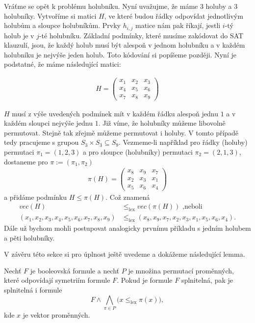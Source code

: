 \begin{prikl}
Vráťme se opět k problému holubníku. Nyní uvažujme, že máme 3 holuby a 3 holubníky. Vytvoříme si matici $H$, ve které budou řádky odpovídat jednotlivým holubům a sloupce holubníkům. Prvky $h_{i,j}$ matice nám pak říkají, jestli $i$-tý holub je v $j$-té holubníku. Základní podmínky, které musíme zakódovat do SAT klauzulí, jsou, že každý holub musí být alespoň v jednom holubníku a v každém holubníku je nejvýše jeden holub. Toto kódování si popíšeme později. Nyní je podstatné, že máme následující matici:

\begin{align*}
H =  \begin{pmatrix}
x_1 & x_2 & x_3 \\
x_4 & x_5 & x_6 \\
x_7 & x_8 & x_9 
\end{pmatrix}
\end{align*}

$H$ musí z výše uvedených podmínek mít v každém řádku alespoň jednu $1$ a v každém sloupci nejvýše jednu $1$. Již víme, že holubníky můžeme libovolně permutovat. Stejně tak zřejmě můžeme permutovat i holuby. V tomto případě tedy pracujeme s grupou $S_3 \times S_3 \subseteq S_9$. Vezmeme-li například pro řádky (holuby) permutaci $\pi_1 = (1,2,3)$ a pro sloupce (holubníky) permutaci $\pi_2 = (2,1,3)$, dostaneme pro $\pi := (\pi_1, \pi_2)$
\begin{align*}
\pi(H) =  \begin{pmatrix}
x_8 & x_9 & x_7 \\
x_2 & x_3 & x_1 \\
x_5 & x_6 & x_4 
\end{pmatrix}
\end{align*}
a přidáme podmínku $H \leq \pi(H)$. Což znamená 
\begin{align*}
vec(H) &\leq_{\text{lex}} vec(\pi(H)) \text{ ,neboli}\\
(x_1, x_2, x_3, x_4, x_5, x_6, x_7, x_8, x_9) &\leq_{\text{lex}} (x_8, x_9, x_7, x_2, x_3, x_1, x_5, x_6, x_4).
\end{align*}
Dále už bychom mohli postupovat analogicky prvnímu příkladu s jedním holubem a pěti holubníky.
\end{prikl}

V závěru této sekce si pro úplnost ještě uvedeme a dokážeme následující lemma.

\begin{lemma}
Nechť $F$ je booleovská formule a nechť $P$ je množina permutací proměnných, které odpovídají symetriím formule $F$. Pokud je formule $F$ splnitelná, pak je splnitelná i formule \[ F \land \bigwedge_{\pi \in P} \bigl( x \leq_{\mathrm{lex}} \pi(x) \bigr), \] kde $x$ je vektor proměnných.
\end{lemma}

